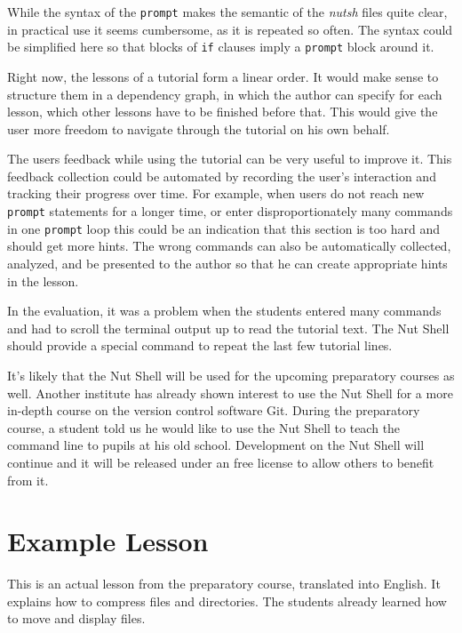 \documentclass[paper=a4,twoside,abstract=on,cleardoublepage=empty,numbers=noenddot,toc=bib,toc=listof,12pt,appendixprefix=true]{scrreprt}
\begin{document}
While the syntax of the \texttt{prompt} makes the semantic of the \emph{nutsh} files quite clear, in practical use it seems cumbersome, as it is repeated so often. The syntax could be simplified here so that blocks of \texttt{if} clauses imply a \texttt{prompt} block around it.

Right now, the lessons of a tutorial form a linear order. It would make sense to structure them in a dependency graph, in which the author can specify for each lesson, which other lessons have to be finished before that. This would give the user more freedom to navigate through the tutorial on his own behalf.


The users feedback while using the tutorial can be very useful to improve it. This feedback collection could be automated by recording the user's interaction and tracking their progress over time. For example, when users do not reach new \texttt{prompt} statements for a longer time, or enter disproportionately many commands in one \texttt{prompt} loop this could be an indication that this section is too hard and should get more hints. The wrong commands can also be automatically collected, analyzed, and be presented to the author so that he can create appropriate hints in the lesson.

In the evaluation, it was a problem when the students entered many commands and had to scroll the terminal output up to read the tutorial text. The Nut Shell should provide a special command to repeat the last few tutorial lines.

It's likely that the Nut Shell will be used for the upcoming preparatory courses as well. Another institute has already shown interest to use the Nut Shell for a more in-depth course on the version control software Git. During the preparatory course, a student told us he would like to use the Nut Shell to teach the command line to pupils at his old school. Development on the Nut Shell will continue and it will be released under an free license to allow others to benefit from it.

\cleardoublepage
\appendix

\chapter{Example Lesson}
\label{sec:nutshexample}

This is an actual lesson from the preparatory course, translated into English. It explains how to compress files and directories. The students already learned how to move and display files.
\end{document}
